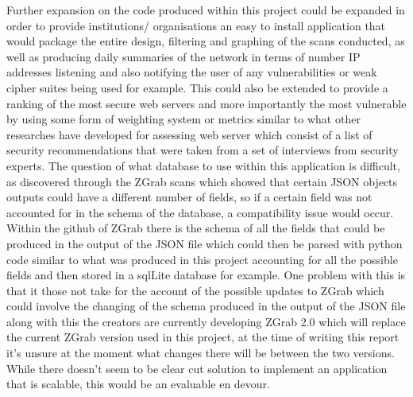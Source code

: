 \documentclass[a4wide,leqno,12pt]{report}
\begin{document}
Further expansion on the code produced within this project could be expanded in order to provide institutions/ organisations an easy to install application that would package the entire design, filtering and graphing of the scans conducted, as well as producing daily summaries of the network in terms of number IP addresses listening and also notifying the user of any vulnerabilities or weak cipher suites being used for example. This could also be extended to provide a ranking of the most secure web servers and more importantly the most vulnerable by using some form of weighting system or metrics similar to what other researches \cite{mendes2008assessing} have developed for assessing web server which consist of a list of security recommendations that were taken from a set of interviews from security experts. The question of what database to use within this application is difficult, as discovered through the ZGrab scans which showed that certain JSON objects outputs could have a different number of fields, so if a certain field was not accounted for in the schema of the database, a compatibility issue would occur. Within the github of ZGrab \cite{zgrabGithub} there is the schema of all the fields that could be produced in the output of the JSON file which could then be parsed with python code similar to what was produced in this project accounting for all the possible fields and then stored in a sqlLite database for example. One problem with this is that it those not take for the account of the possible updates to ZGrab which could involve the changing of the schema produced in the output of the JSON file along with this the creators are currently developing ZGrab 2.0 \cite{zgrab2Github} which will replace the current ZGrab version used in this project, at the time of writing this report it's unsure at the moment what changes there will be between the two versions. While there doesn't seem to be clear cut solution to implement an application that is scalable, this would be an evaluable en devour.

\bgroup
\linespread{1}



\egroup %
\end{document}
